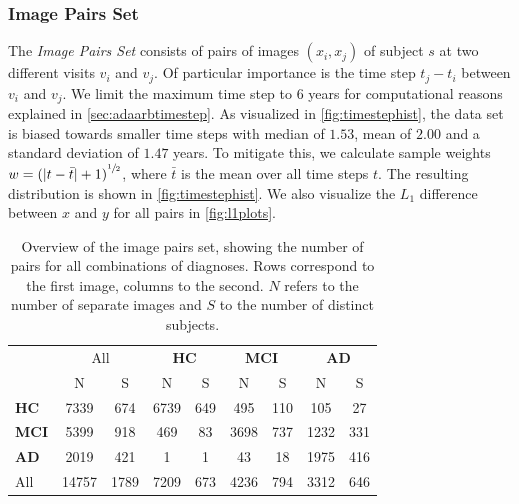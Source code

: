 \subsubsection*{Image Pairs Set}
\label{sec:datpairs}
The \textit{Image Pairs Set} consists of pairs of images $(x_i, x_j)$ of subject $s$ at two different visits $v_i$ and $v_j$. Of particular importance is the time step $t_j - t_i$ between $v_i$ and $v_j$. We limit the maximum time step to 6 years for computational reasons explained in \autoref{sec:adaarbtimestep}. As visualized in \autoref{fig:timestephist}, the data set is biased towards smaller time steps with median of $1.53$, mean of $2.00$ and a standard deviation of $1.47$ years. To mitigate this, we calculate sample weights $w = {(| t - \bar t | + 1)}^{\sfrac{1}{2}}$, where $\bar t$ is the mean over all time steps $t$. The resulting distribution is shown in \autoref{fig:timestephist}. We also visualize the $L_1$ difference between $x$ and $y$ for all pairs in \autoref{fig:l1plots}.

\begin{table}[p]
	\begin{center}
		\begin{tabular}{l c c | c c c c c c}
			\toprule
			& 
			\multicolumn{2}{c}{All} &
			\multicolumn{2}{c}{\bfseries HC} & 
			\multicolumn{2}{c}{\bfseries MCI} & 
			\multicolumn{2}{c}{\bfseries AD} \\
			\cmidrule(lr){2-3}
			\cmidrule(lr){4-5}
			\cmidrule(lr){6-7}
			\cmidrule(lr){8-9}
			& N & \multicolumn{1}{c}{S} & N & S & N & S & N & S \\ 
			\cmidrule(lr){1-9}
			\bfseries HC  &  7339 &  674 & 6739 & 649 &  495 & 110 &  105 &  27 \\
			\bfseries MCI &  5399 &  918 &  469 &  83 & 3698 & 737 & 1232 & 331 \\
			\bfseries AD  &  2019 &  421 &    1 &   1 &   43 &  18 & 1975 & 416 \\
			\cmidrule(lr){1-9}
			All           & 14757 & 1789 & 7209 & 673 & 4236 & 794 & 3312 & 646 \\
			\bottomrule
		\end{tabular}
		\caption{Overview of the image pairs set, showing the number of pairs for all combinations of diagnoses. Rows correspond to the first image, columns to the second. $N$ refers to the number of separate images and $S$ to the number of distinct subjects.}
		\label{tab:pairsset}
	\end{center}
\end{table}

